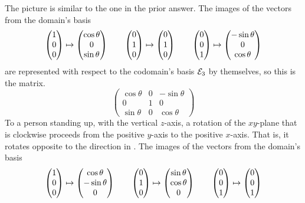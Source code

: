 \begin{exercises}
\begin{answer}
\begin{exparts}
       \partsitem The picture is similar to the one in the prior answer. 
         The images of the vectors from the domain's basis 
         \begin{equation*}
           \begin{pmatrix} 1 \\ 0 \\ 0 \end{pmatrix}\mapsto\begin{pmatrix} \cos\theta \\ 0 \\ \sin\theta \end{pmatrix}
           \qquad
           \begin{pmatrix} 0 \\ 1 \\ 0 \end{pmatrix}\mapsto\begin{pmatrix} 0 \\ 1 \\ 0 \end{pmatrix}
           \qquad
           \begin{pmatrix} 0 \\ 0 \\ 1 \end{pmatrix}\mapsto\begin{pmatrix} -\sin\theta \\ 0 \\ \cos\theta \end{pmatrix}
         \end{equation*}
         are represented with respect to the codomain's basis ${\cal E}_3$
         by themselves, so this is the matrix.
         \begin{equation*}
            \begin{pmatrix}
              \cos\theta  &0       &-\sin\theta   \\
              0           &1       &0             \\
              \sin\theta  &0       &\cos\theta
            \end{pmatrix}                  
         \end{equation*}
       \partsitem To a person standing up, with the vertical $z$-axis,
         a rotation of the $xy$-plane that is clockwise proceeds from
         the positive $y$-axis to the positive $x$-axis.
         That is, it rotates opposite to the direction in  
         .
         The images of the vectors from the domain's basis 
         \begin{equation*}
           \colvec{1 \\ 0 \\ 0}\mapsto\colvec{\cos\theta \\ -\sin\theta \\ 0}
           \qquad
           \colvec{0 \\ 1 \\ 0}\mapsto\colvec{\sin\theta \\ \cos\theta \\ 0}
           \qquad
           \colvec{0 \\ 0 \\ 1}\mapsto\colvec{0 \\ 0 \\ 1}

\end{equation*}
\end{exparts}
\end{answer}
\end{exercises}
